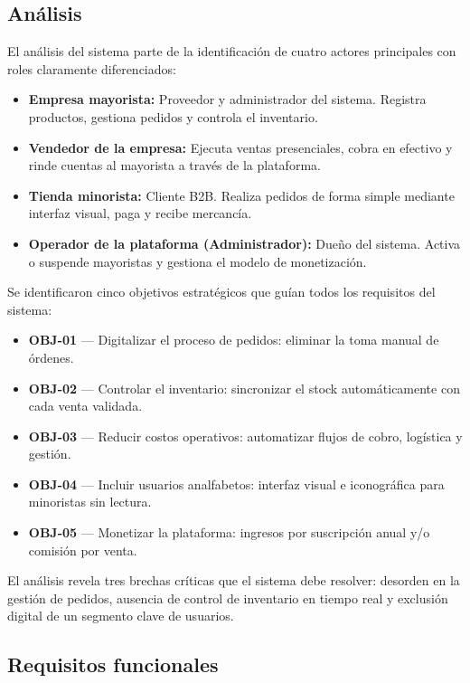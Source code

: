 \documentclass[12pt, a4paper]{article}
\begin{document}
\subsection{Análisis}

El análisis del sistema parte de la identificación de cuatro actores principales con roles claramente diferenciados:

\begin{itemize}
  \item \textbf{Empresa mayorista:} Proveedor y administrador del sistema. Registra productos, gestiona pedidos y controla el inventario.
  \item \textbf{Vendedor de la empresa:} Ejecuta ventas presenciales, cobra en efectivo y rinde cuentas al mayorista a través de la plataforma.
  \item \textbf{Tienda minorista:} Cliente B2B. Realiza pedidos de forma simple mediante interfaz visual, paga y recibe mercancía.
  \item \textbf{Operador de la plataforma (Administrador):} Dueño del sistema. Activa o suspende mayoristas y gestiona el modelo de monetización.
\end{itemize}

Se identificaron cinco objetivos estratégicos que guían todos los requisitos del sistema:

\begin{itemize}
  \item \textbf{OBJ-01} --- Digitalizar el proceso de pedidos: eliminar la toma manual de órdenes.
  \item \textbf{OBJ-02} --- Controlar el inventario: sincronizar el stock automáticamente con cada venta validada.
  \item \textbf{OBJ-03} --- Reducir costos operativos: automatizar flujos de cobro, logística y gestión.
  \item \textbf{OBJ-04} --- Incluir usuarios analfabetos: interfaz visual e iconográfica para minoristas sin lectura.
  \item \textbf{OBJ-05} --- Monetizar la plataforma: ingresos por suscripción anual y/o comisión por venta.
\end{itemize}

El análisis revela tres brechas críticas que el sistema debe resolver: desorden en la gestión de pedidos, ausencia de control de inventario en tiempo real y exclusión digital de un segmento clave de usuarios.

\subsection{Requisitos funcionales}
\end{document}
